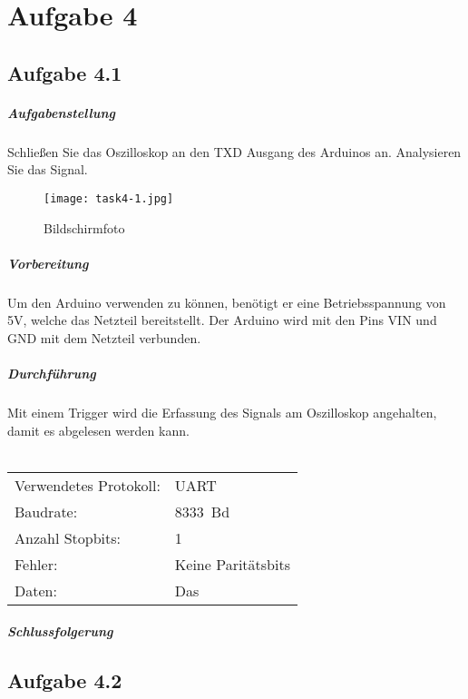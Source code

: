 \chapter{Aufgabe 4}
\section{Aufgabe 4.1}
\paragraph{Aufgabenstellung}
Schließen Sie das Oszilloskop an den TXD Ausgang des Arduinos an. Analysieren Sie das Signal.

\begin{figure}
	\centering
	\texttt{[image: task4-1.jpg]}
	\caption{Bildschirmfoto}
	\label{task4-1}
\end{figure}

\paragraph{Vorbereitung}
Um den Arduino verwenden zu können, benötigt er eine Betriebsspannung von 5V, welche das Netzteil bereitstellt. Der Arduino wird mit den Pins VIN und GND mit dem Netzteil verbunden.

\paragraph{Durchführung}
Mit einem Trigger wird die Erfassung des Signals am Oszilloskop angehalten, damit es abgelesen werden kann.\\\\
\begin{tabular}{ll}
	Verwendetes Protokoll: & UART       \\
	Baudrate:              & \SI{8333}{Bd} \\
	Anzahl Stopbits:       & 1          \\
	Fehler:                & Keine Paritätsbits       \\
	Daten:                 & Das
\end{tabular}

\paragraph{Schlussfolgerung}


\section{Aufgabe 4.2}
